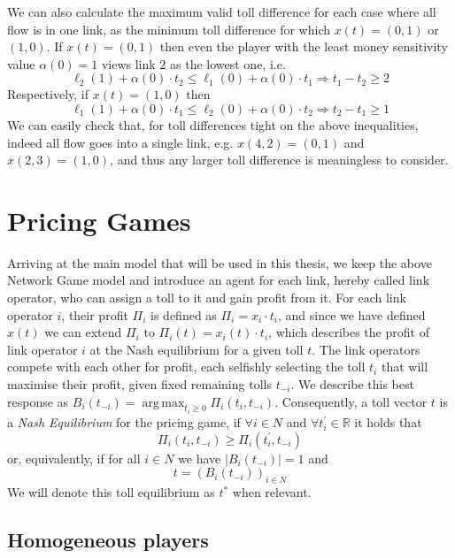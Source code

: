\documentclass[10pt,a4paper]{book}
\newcommand{\R}{\mathbb{R}}
\DeclareMathOperator*{\argmax}{arg\,max}
\theoremstyle{definition}
\theoremstyle{comment}
\begin{document}
We can also calculate the maximum valid toll difference for each case where all flow is in one link, as the minimum toll difference for which $x(t) = (0, 1)$ or $(1, 0)$.
If $x(t) = (0, 1)$ then even the player with the least money sensitivity value $\alpha(0) = 1$ views link $2$ as the lowest one, i.e.
\[
\ell_2(1) + \alpha(0) \cdot t_2 \le \ell_1(0) + \alpha(0) \cdot t_1 \Rightarrow t_1 - t_2 \ge 2
\]
Respectively, if $x(t) = (1, 0)$ then
\[
\ell_1(1) + \alpha(0) \cdot t_1 \le \ell_2(0) + \alpha(0) \cdot t_2 \Rightarrow t_2 - t_1 \ge 1
\]
We can easily check that, for toll differences tight on the above inequalities, indeed all flow goes into a single link, e.g. $x(4, 2) = (0, 1)$ and $x(2, 3) = (1, 0)$, and thus any larger toll difference is meaningless to consider.

\section*{Pricing Games}

Arriving at the main model that will be used in this thesis, we keep the above Network Game model and introduce an agent for each link, hereby called link operator, who can assign a toll to it and gain profit from it.
For each link operator $i$, their profit $\Pi_i$ is defined as $\Pi_i = x_i \cdot t_i$, and since we have defined $x(t)$ we can extend $\Pi_i$ to $\Pi_i(t) = x_i(t) \cdot t_i$, which describes the profit of link operator $i$ at the Nash equilibrium for a given toll $t$.
The link operators compete with each other for profit, each selfishly selecting the toll $t_i$ that will maximise their profit, given fixed remaining tolls $t_{-i}$.
We describe this best response as $B_i(t_{-i}) = \argmax_{t_i \geq 0} \Pi_i(t_i, t_{-i})$.
Consequently, a toll vector $t$ is a \textit{Nash Equilibrium} for the pricing game, if $\forall i \in N$ and $\forall t_i^\prime \in \R$ it holds that
\[\Pi_i(t_i, t_{-i}) \geq \Pi_i(t_i^\prime, t_{-i})\]
or, equivalently, if for all $i \in N$ we have $|B_i(t_{-i})| = 1$ and
\[t = (B_i(t_{-i}))_{i \in N}\]
We will denote this toll equilibrium as $t^*$ when relevant.

\subsection*{Homogeneous players}
\end{document}
